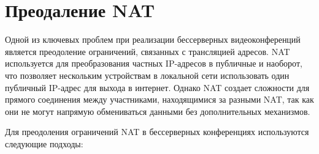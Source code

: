 \section{Преодаление NAT}

Одной из ключевых проблем при реализации бессерверных видеоконференций является преодоление ограничений, связанных с трансляцией адресов.
NAT используется для преобразования частных IP-адресов в публичные и наоборот, что позволяет нескольким устройствам в локальной сети использовать один публичный IP-адрес для выхода в интернет.
Однако NAT создает сложности для прямого соединения между участниками, находящимися за разными NAT, так как они не могут напрямую обмениваться данными без дополнительных механизмов.

Для преодоления ограничений NAT в бессерверных конференциях используются следующие подходы:

